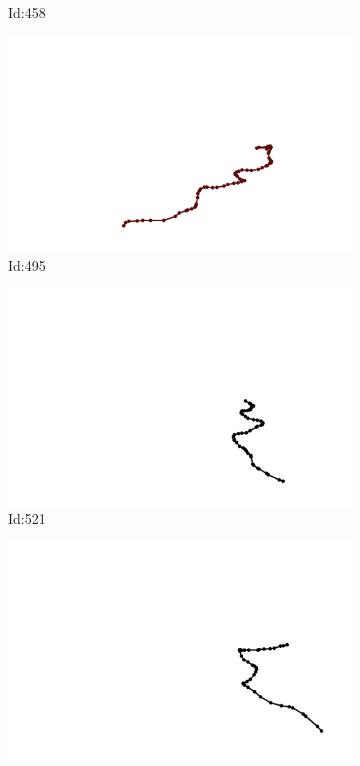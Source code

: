 \documentclass[12pt,twoside]{report}
\begin{document}
\begin{figure}
\begin{subfigure}[b]{0.20\textwidth}
\caption{Id:458}
\end{subfigure}
\begin{subfigure}[b]{0.20\textwidth}
\centering
\includegraphics[width=\textwidth]{../trajectories/495.png}
\caption{Id:495}
\end{subfigure}
\begin{subfigure}[b]{0.20\textwidth}
\centering
\includegraphics[width=\textwidth]{../trajectories/521.png}
\caption{Id:521}
\end{subfigure}
\begin{subfigure}[b]{0.20\textwidth}
\centering
\includegraphics[width=\textwidth]{../trajectories/549.png}

\end{subfigure}
\end{figure}
\end{document}
